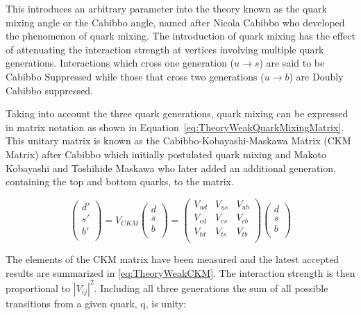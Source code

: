 This introduces an arbitrary parameter into the theory known as the quark mixing angle or the Cabibbo angle, named after Nicola Cabibbo who developed the phenomenon of quark mixing. The introduction of quark mixing has the effect of attenuating the interaction strength at vertices involving multiple quark generations. Interactions which cross one generation ($u\rightarrow s$) are said to be Cabibbo Suppressed while those that cross two generations ($u\rightarrow b$) are Doubly Cabibbo suppressed.

Taking into account the three quark generations, quark mixing can be expressed in matrix notation as shown in Equation~\ref{eq:TheoryWeakQuarkMixingMatrix}. This unitary matrix is known as the Cabibbo-Kobayashi-Maskawa Matrix (CKM Matrix) after Cabibbo which initially postulated quark mixing and Makoto Kobayashi and Toshihide Maskawa who later added an additional generation, containing the top and bottom quarks, to the matrix.

\begin{equation}
\label{eq:TheoryWeakQuarkMixingMatrix}
\begin{pmatrix}
  d' \\
  s' \\
  b' \\
\end{pmatrix}
=
V_{CKM}
\begin{pmatrix}
  d \\
  s \\
  b \\
\end{pmatrix}
=
\begin{pmatrix}
  V_{ud} & V_{us} & V_{ub} \\
  V_{cd} & V_{cs} & V_{cb} \\
  V_{td} & V_{ts} & V_{tb} \\
\end{pmatrix}
\begin{pmatrix}
  d \\
  s \\
  b \\
\end{pmatrix}
\end{equation}

The elements of the CKM matrix have been measured and the latest accepted results are summarized in \ref{eq:TheoryWeakCKM}. The interaction strength is then proportional to $|V_{ij}|^{2}$. Including all three generations the sum of all possible transitions from a given quark, q, is unity:

